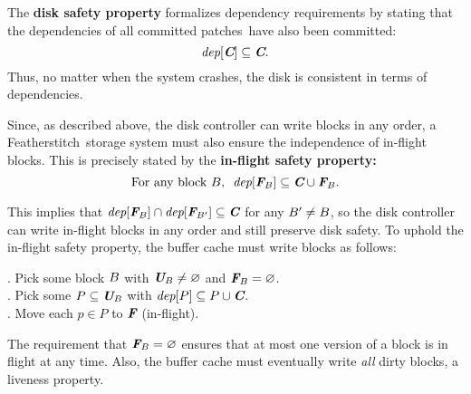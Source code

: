\documentclass[9pt,twocolumn,letterpaper]{article}
\newcommand{\Kudos}{Featherstitch}
\newcommand{\patches}{patches}
\begin{document}
The \textbf{disk safety property} formalizes dependency requirements by
 stating that the dependencies of all committed \patches\ have also been
 committed:
%
\[ \PDepset{\PDisk} \subseteq \PDisk. \]
%
Thus, no matter when the system crashes, the disk is consistent in terms of
dependencies.
%
%
\begin{comment}
 However, \Kudos\ can only control when \patches\ are handed to the disk
 controller, not when they are written to disk.
 Disk controller behavior is encapsulated in the following atomic action:

 \begin{tabbing}
 \textit{Commit block:} \\
 \quad Pick some block $b$ with $\PInf[b] \neq \emptyset$. \\
 \quad Move each $p \in \PInf[b]$ to $\PDisk$ (committed).
 \end{tabbing}
\end{comment}
%
Since, as described above, the disk controller can write blocks in any
 order, a \Kudos\ storage system must also ensure
the independence of in-flight blocks.  This is precisely stated
by the \textbf{in-flight safety property:}
%
\[ \text{For any block $\PB$,~~} \PDepset{\PInf[\PB]} \subseteq \PDisk \cup \PInf[\PB] . \]
%
\begin{comment}
(The union with $\PInf[\PB]$ is necessary for the case of multiple in-flight
\patches\ on the same block.)
\end{comment}
%
This implies that $\PDepset{\PInf[\PB]} \cap \PDepset{\PInf[\PB']} \subseteq \PDisk$ for
 any $B' \neq B$, so the disk controller can write in-flight blocks
 in any order and still preserve disk safety.
%
To uphold the in-flight safety property, the buffer cache must
 write blocks as follows:
%
\begin{tabbing}
\quad {}. Pick some block $B$ with $\PMem[\PB] \neq \emptyset$ and $\PInf[\PB] =
\emptyset$. \\
\quad {}. Pick some $P \subseteq \PMem[\PB]$ with $\PDepset{P} \subseteq P \cup
\PDisk$. \\
\quad {}. Move each $p \in P$ to $\PInf$ (in-flight).
\end{tabbing}
%
\noindent
%
The requirement that $\PInf[\PB] = \emptyset$ ensures that at most one version of
 a block is in flight at any time.
%
Also, the buffer cache must eventually write \emph{all} dirty blocks, a
 liveness property.
\end{document}
